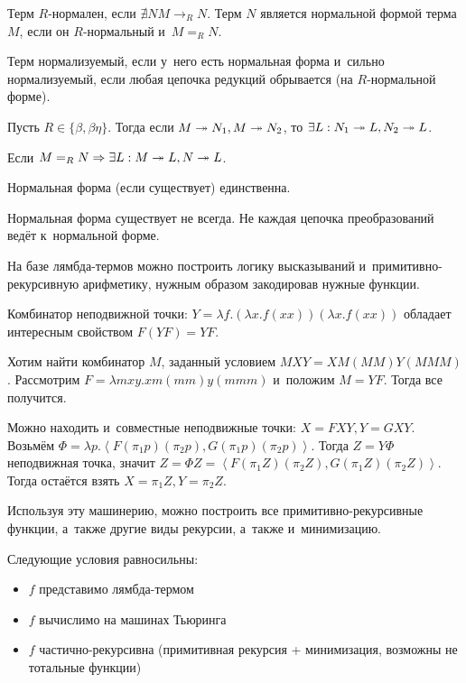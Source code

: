 \documentclass{article}
\begin{document}
\begin{definition}
	Терм $R$-нормален, если $\nexists N M \rightarrow_R N$. Терм $N$ является нормальной формой терма
	$M$, если он $R$-нормальный и~$M =_R N$.

	Терм нормализуемый, если у~него есть нормальная форма и~сильно нормализуемый, если любая цепочка
	редукций обрывается (на $R$-нормальной форме).
\end{definition}

\begin{lemma}[О~ромбе]
	Пусть $R \in \{\beta, \beta\eta\}$. Тогда если $M \twoheadrightarrow N_1, M \twoheadrightarrow N_2$, то
	$\exists L: N_1 \twoheadrightarrow L, N_2 \twoheadrightarrow L$.
\end{lemma}

\begin{theorem}
	Если $M =_R N \Rightarrow \exists L: M \twoheadrightarrow L, N \twoheadrightarrow L$.
\end{theorem}
\begin{corollary}
	Нормальная форма (если существует) единственна.
\end{corollary}

Нормальная форма существует не всегда. Не каждая цепочка преобразований ведёт к~нормальной форме.

\begin{claim}
	На базе лямбда-термов можно построить логику высказываний и~примитивно-рекурсивную арифметику,
	нужным образом закодировав нужные функции.
\end{claim}

Комбинатор неподвижной точки: $Y = \lambda f. (\lambda x.f(xx))(\lambda x.f(xx))$ обладает
интересным свойством $F(YF) = YF$.

\begin{example}
	Хотим найти комбинатор $M$, заданный условием $MXY = XM(MM)Y(MMM)$. Рассмотрим $F = \lambda mxy.
	xm(mm)y(mmm)$ и~положим $M = YF$. Тогда все получится.

	Можно находить и~совместные неподвижные точки: $X = FXY, Y = GXY$. Возьмём $\Phi = \lambda
	p.\left< F(\pi_1 p)(\pi_2 p), G(\pi_1 p)(\pi_2 p)\right>$. Тогда $Z = Y\Phi$ неподвижная точка,
	значит $Z = \Phi Z = \left< F(\pi_1 Z)(\pi_2 Z), G(\pi_1 Z)(\pi_2 Z)\right>$. Тогда остаётся взять
	$X = \pi_1 Z, Y = \pi_2 Z$.
\end{example}

Используя эту машинерию, можно построить все примитивно-рекурсивные функции, а~также другие виды
рекурсии, а~также и~минимизацию.

\begin{theorem}
	Следующие условия равносильны:
	\begin{itemize}
		\item $f$ представимо лямбда-термом
		\item $f$ вычислимо на машинах Тьюринга
		\item $f$ частично-рекурсивна (примитивная рекурсия + минимизация, возможны не тотальные
			функции)
	\end{itemize}
\end{theorem}
\end{document}
